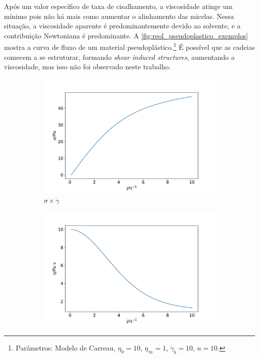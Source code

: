 			Após um valor específico de taxa de cisalhamento, a viscosidade atinge um mínimo pois não há mais como aumentar o alinhamento das micelas. Nessa situação, a viscosidade aparente é predominantemente devido ao solvente, e a contribuição Newtoniana é predominante. A \autoref{fig:reol_pseudoplastico_exemplos} mostra a curva de fluxo de um material pseudoplástico.\footnote{Parâmetros: Modelo de Carreau, \(\eta_0=10\), \(\eta_{\infty}=1\), \(\dot{\gamma}_b=10\), \(n=10\).} É possível que as cadeias comecem a se estruturar, formando \emph{shear induced structures}, aumentando a viscosidade,\cite{Landazuri2013a} mas isso não foi observado neste trabalho. 

			\begin{figure}[h]
				\begin{subfigure}[t]{.5\textwidth}
					\includegraphics[width=\textwidth]{./imagens/reologia/pseudoplastico_tau}
					\caption{\(\sigma \times \dot{\gamma}\)}
					\label{fig:reol_pseudo_tauGP}
				\end{subfigure}%
				\begin{subfigure}[t]{.5\textwidth}
					\includegraphics[width=\textwidth]{./imagens/reologia/pseudoplastico_eta}

\end{subfigure}
\end{figure}
